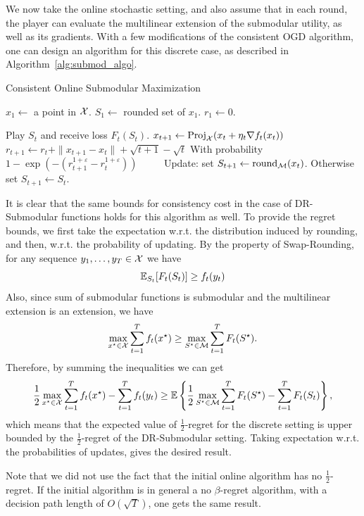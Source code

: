 We now take the online stochastic setting, and also assume that in each round, the player can evaluate the multilinear extension of the submodular utility, as well as its gradients. With a few modifications of the consistent OGD algorithm, one can design an algorithm for this discrete case, as described in Algorithm~\ref{alg:submod_algo}.

\begin{algorithm}[ht] 
\caption{Consistent Online Submodular Maximization}
\label{alg:submod_algo}
\begin{algorithmic}
  \STATE $x_1 \leftarrow$ a point in $\mathcal{X}$.
  \STATE $S_1 \leftarrow$ rounded set of $x_1$.
  \STATE $r_1 \leftarrow 0$.

  \STATE Play $S_t$ and receive loss $F_t(S_t)$. 
  \STATE $x_{t+1} \leftarrow \mathrm{Proj}_{\mathcal{X}}(x_t + \eta_t \nabla f_t(x_t))$
  \STATE $r_{t+1} \leftarrow r_t + \|x_{t+1} - x_t\| + \sqrt{t+1} - \sqrt{t}$
  \STATE With probability $1 - \exp(-(r_{t+1}^{1+\varepsilon}- r_{t}^{1+\varepsilon}))$
  \STATE $\qquad$ Update: set $S_{t+1} \leftarrow \mathrm{round}_{\mathcal{M}}(x_t)$.
  \STATE Otherwise set $S_{t+1} \leftarrow S_t$.
  \ENDFOR
\end{algorithmic}
\end{algorithm}

It is clear that the same bounds for consistency cost in the case of DR-Submodular functions holds for this algorithm as well. To provide the regret bounds, we first take the expectation w.r.t. the distribution induced by rounding, and then, w.r.t. the probability of updating. By the property of Swap-Rounding, for any sequence $y_1, \ldots, y_T \in \mathcal{X}$ we have
\[
    \mathbb{E}_{S_t}[F_t(S_t)] \geq f_t(y_t)
\]
Also, since sum of submodular functions is submodular and the multilinear extension is an extension, we have
\[
    \max_{x^\star\in \mathcal{X}} \sum_{t=1}^T f_t(x^\star) \geq \max_{S^\star\in \mathcal{M}} \sum_{t=1}^T F_t(S^\star).
\]
Therefore, by summing the inequalities we can get
\begin{align*}
    \frac{1}{2}\max_{x^\star\in \mathcal{X}} \sum_{t=1}^T f_t(x^\star) - \sum_{t=1}^T f_t(y_t) \geq \mathbb{E}\left\{ \frac{1}{2}\max_{S^\star\in \mathcal{M}} \sum_{t=1}^T F_t(S^\star) - \sum_{t=1}^T F_t(S_t) \right\},
\end{align*}
which means that the expected value of $\frac{1}{2}$-regret for the discrete setting is upper bounded by the $\frac{1}{2}$-regret of the DR-Submodular setting. Taking expectation w.r.t. the probabilities of updates, gives the desired result.

\begin{remark}
    Note that we did not use the fact that the initial online algorithm has no $\frac{1}{2}$-regret. If the initial algorithm is in general a no $\beta$-regret algorithm, with a decision path length of $O(\sqrt{T})$, one gets the same result.
\end{remark} 


